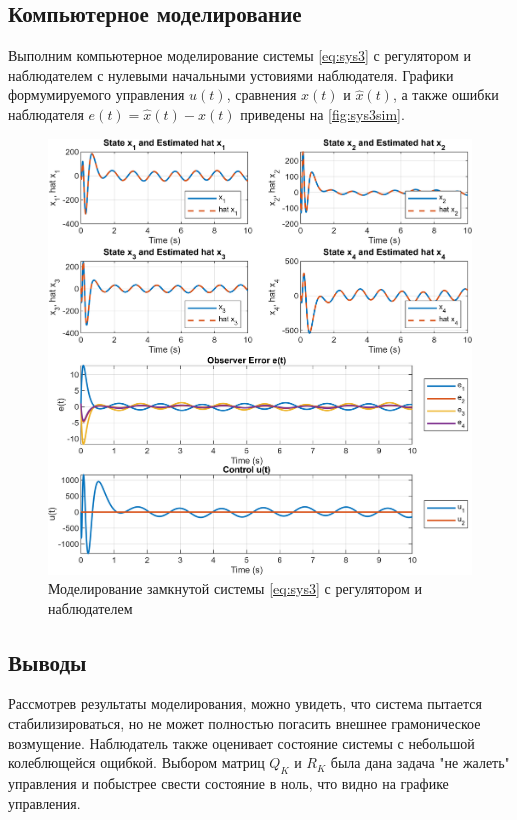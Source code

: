 \subsection{Компьютерное моделирование}
Выполним компьютерное моделирование системы \eqref{eq:sys3} с регулятором и наблюдателем
с нулевыми начальными устовиями наблюдателя. Графики формумируемого управления $u(t)$,
сравнения $x(t)$ и $\hat x(t)$, а также ошибки наблюдателя $e(t)=\hat x(t)-x(t)$
приведены на \autoref{fig:sys3sim}.

\begin{figure}[H]
    \centering
    \includegraphics[width=1\linewidth]{figs/3_sim.png}
    \caption{Моделирование замкнутой системы \eqref{eq:sys3} с регулятором и наблюдателем}
    \label{fig:sys3sim}
\end{figure}

\newpage\subsection{Выводы}
Рассмотрев результаты моделирования, можно увидеть, что 
система пытается стабилизироваться, но не может полностью погасить внешнее
грамоническое возмущение. 
Наблюдатель также оценивает состояние системы с небольшой колеблющейся ощибкой.
Выбором матриц $Q_K$ и $R_K$ была дана задача "не жалеть" управления и побыстрее
свести состояние в ноль, что видно на графике управления.


